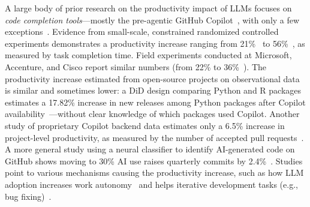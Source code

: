 A large body of prior research on the productivity impact of LLMs focuses on \emph{code completion tools}---mostly the pre-agentic GitHub Copilot~\cite{DBLP:conf/pldi/0001KLRRSSA22, DBLP:conf/chi/Vaithilingam0G22, DBLP:conf/icse/Imai22, dohmke2023sea, DBLP:journals/corr/abs-2302-06590, hoffmann2024generative, DBLP:conf/icis/YeverechyahuMO24, DBLP:journals/corr/abs-2410-02091, cui2025effects, DBLP:journals/corr/abs-2406-17910, stray2025developer}, with only a few exceptions~\cite{DBLP:conf/icse-seip/ParadisGMNMMZFC25, kumar2025intuition}.
Evidence from small-scale, constrained randomized controlled experiments demonstrates a productivity increase ranging from 21\%~\cite{DBLP:journals/corr/abs-2410-02091}
to 56\%~\cite{DBLP:journals/corr/abs-2302-06590}, as measured by task completion time.
Field experiments conducted at Microsoft, Accenture, and Cisco report similar numbers (from 22\% \cite{cui2025effects} to 36\%~\cite{DBLP:journals/corr/abs-2406-17910}). 
The productivity increase estimated from open-source projects on observational data is similar and sometimes lower: a DiD design comparing Python and R packages estimates a 17.82\% increase in new releases among Python packages after Copilot availability~\cite{DBLP:conf/icis/YeverechyahuMO24}---without clear knowledge of which packages used Copilot.
Another study of proprietary Copilot backend data estimates only a 6.5\% increase in project-level productivity, as measured by the number of accepted pull requests~\cite{DBLP:journals/corr/abs-2410-02091}.
A more general study using a neural classifier to identify AI-generated code on GitHub shows moving to 30\% AI use raises quarterly commits by 2.4\%~\cite{daniotti2025using}.
Studies point to various mechanisms causing the productivity increase, such as how LLM adoption increases work autonomy~\cite{hoffmann2024generative} and helps iterative development tasks (e.g., bug fixing)~\cite{DBLP:conf/icis/YeverechyahuMO24}.

